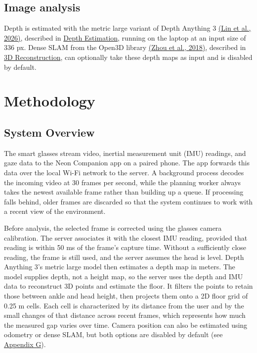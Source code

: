 \documentclass[a4paper]{article}
\begin{document}
\subsection{Image analysis} \label{image-analysis}
Depth is estimated with the metric large variant of Depth Anything 3 \hyperref[references]{(Lin et al., 2026)}, described in \hyperref[depth-estimation]{Depth Estimation}, running on the laptop at an input size of 336 px. Dense SLAM from the Open3D library \hyperref[references]{(Zhou et al., 2018)}, described in \hyperref[3d-reconstruction]{3D Reconstruction}, can optionally take these depth maps as input and is disabled by default.
\section{Methodology} \label{methodology}

\subsection{System Overview} \label{system-overview}
The smart glasses stream video, inertial measurement unit (IMU) readings, and gaze data to the Neon Companion app on a paired phone. The app forwards this data over the local Wi-Fi network to the server. A background process decodes the incoming video at 30 frames per second, while the planning worker always takes the newest available frame rather than building up a queue. If processing falls behind, older frames are discarded so that the system continues to work with a recent view of the environment.

Before analysis, the selected frame is corrected using the glasses camera calibration. The server associates it with the closest IMU reading, provided that reading is within 50 ms of the frame's capture time. Without a sufficiently close reading, the frame is still used, and the server assumes the head is level. Depth Anything 3's metric large model then estimates a depth map in meters. The model supplies depth, not a height map, so the server uses the depth and IMU data to reconstruct 3D points and estimate the floor. It filters the points to retain those between ankle and head height, then projects them onto a 2D floor grid of 0.25 m cells. Each cell is characterized by its distance from the user and by the small changes of that distance across recent frames, which represents how much the measured gap varies over time. Camera position can also be estimated using odometry or dense SLAM, but both options are disabled by default (see \hyperref[g-camera-position]{Appendix G}).
\end{document}
